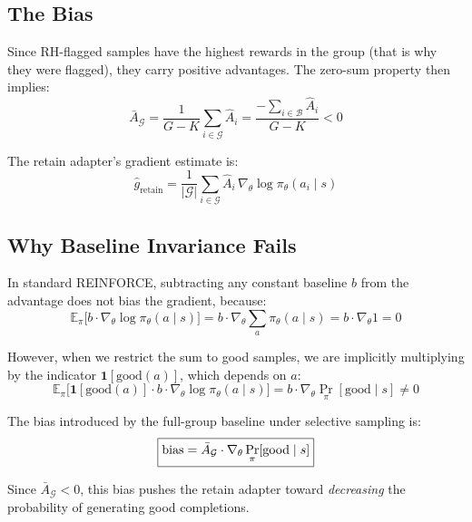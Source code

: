 \documentclass[11pt]{article}
\begin{document}
\subsection{The Bias}

Since RH-flagged samples have the highest rewards in the group (that is why they
were flagged), they carry positive advantages. The zero-sum property then implies:
\begin{equation}\label{eq:negative-mean}
    \bar{A}_{\mathcal{G}}
    = \frac{1}{G-K}\sum_{i \in \mathcal{G}} \hat{A}_i
    = \frac{-\sum_{i \in \mathcal{B}} \hat{A}_i}{G - K}
    < 0
\end{equation}

The retain adapter's gradient estimate is:
\begin{equation}
    \hat{g}_{\text{retain}}
    = \frac{1}{|\mathcal{G}|} \sum_{i \in \mathcal{G}}
        \hat{A}_i \, \nabla_\theta \log \pi_\theta(a_i \mid s)
\end{equation}

\subsection{Why Baseline Invariance Fails}

In standard REINFORCE, subtracting any constant baseline $b$ from the advantage
does not bias the gradient, because:
\begin{equation}
    \mathbb{E}_\pi\bigl[b \cdot \nabla_\theta \log \pi_\theta(a \mid s)\bigr]
    = b \cdot \nabla_\theta \sum_a \pi_\theta(a \mid s)
    = b \cdot \nabla_\theta 1
    = 0
\end{equation}

However, when we restrict the sum to good samples, we are implicitly multiplying
by the indicator $\mathbf{1}[\text{good}(a)]$, which depends on $a$:
\begin{equation}
    \mathbb{E}_\pi\bigl[\mathbf{1}[\text{good}(a)] \cdot b
        \cdot \nabla_\theta \log \pi_\theta(a \mid s)\bigr]
    = b \cdot \nabla_\theta \Pr_\pi[\text{good} \mid s]
    \neq 0
\end{equation}

The bias introduced by the full-group baseline under selective sampling is:
\begin{equation}\label{eq:bias}
    \boxed{%
    \text{bias} = \bar{A}_{\mathcal{G}}
        \cdot \nabla_\theta \Pr_\pi[\text{good} \mid s]}
\end{equation}

Since $\bar{A}_{\mathcal{G}} < 0$, this bias pushes the retain adapter toward
\emph{decreasing} the probability of generating good completions.
\end{document}

